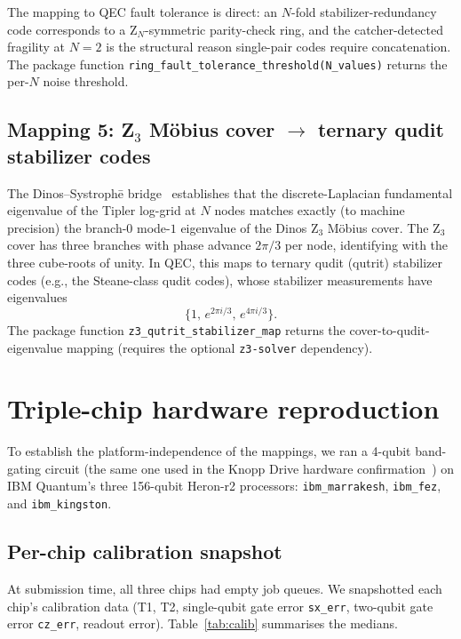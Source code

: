 \documentclass[11pt,a4paper]{article}
\begin{document}
The mapping to QEC fault tolerance is direct: an $N$-fold stabilizer-redundancy code corresponds to a Z$_N$-symmetric parity-check ring, and the catcher-detected fragility at $N=2$ is the structural reason single-pair codes require concatenation. The package function \texttt{ring\_fault\_tolerance\_threshold(N\_values)} returns the per-$N$ noise threshold.

\subsection{Mapping 5: Z$_3$ M\"obius cover $\to$ ternary qudit stabilizer codes}

The Dinos--Systroph\=e bridge~\cite{SystropheRepo} establishes that the discrete-Laplacian fundamental eigenvalue of the Tipler log-grid at $N$ nodes matches exactly (to machine precision) the branch-$0$ mode-$1$ eigenvalue of the Dinos Z$_3$ M\"obius cover. The Z$_3$ cover has three branches with phase advance $2\pi/3$ per node, identifying with the three cube-roots of unity. In QEC, this maps to ternary qudit (qutrit) stabilizer codes (e.g., the Steane-class qudit codes), whose stabilizer measurements have eigenvalues
\begin{equation}
\{1,\, e^{2\pi i / 3},\, e^{4\pi i / 3}\}.
\end{equation}
The package function \texttt{z3\_qutrit\_stabilizer\_map} returns the cover-to-qudit-eigenvalue mapping (requires the optional \texttt{z3-solver} dependency).

\section{Triple-chip hardware reproduction}\label{sec:hw}

To establish the platform-independence of the mappings, we ran a 4-qubit band-gating circuit (the same one used in the Knopp Drive hardware confirmation~\cite{KnoppDrive}) on IBM Quantum's three 156-qubit Heron-r2 processors: \texttt{ibm\_marrakesh}, \texttt{ibm\_fez}, and \texttt{ibm\_kingston}.

\subsection{Per-chip calibration snapshot}

At submission time, all three chips had empty job queues. We snapshotted each chip's calibration data (T1, T2, single-qubit gate error \texttt{sx\_err}, two-qubit gate error \texttt{cz\_err}, readout error). Table~\ref{tab:calib} summarises the medians.
\end{document}
